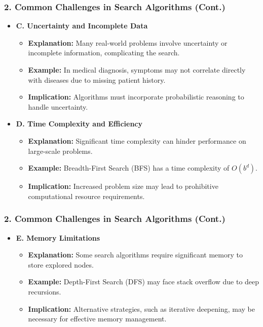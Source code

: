 \documentclass[aspectratio=169]{beamer}
\begin{document}
\begin{frame}[fragile]
    \frametitle{2. Common Challenges in Search Algorithms (Cont.)}
    \begin{itemize}
        \item \textbf{C. Uncertainty and Incomplete Data}
        \begin{itemize}
            \item \textbf{Explanation:} Many real-world problems involve uncertainty or incomplete information, complicating the search.
            \item \textbf{Example:} In medical diagnosis, symptoms may not correlate directly with diseases due to missing patient history.
            \item \textbf{Implication:} Algorithms must incorporate probabilistic reasoning to handle uncertainty.
        \end{itemize}
        
        \item \textbf{D. Time Complexity and Efficiency}
        \begin{itemize}
            \item \textbf{Explanation:} Significant time complexity can hinder performance on large-scale problems.
            \item \textbf{Example:} Breadth-First Search (BFS) has a time complexity of \(O(b^d)\).
            \item \textbf{Implication:} Increased problem size may lead to prohibitive computational resource requirements.
        \end{itemize}
    \end{itemize}
\end{frame}

\begin{frame}[fragile]
    \frametitle{2. Common Challenges in Search Algorithms (Cont.)}
    \begin{itemize}
        \item \textbf{E. Memory Limitations}
        \begin{itemize}
            \item \textbf{Explanation:} Some search algorithms require significant memory to store explored nodes.
            \item \textbf{Example:} Depth-First Search (DFS) may face stack overflow due to deep recursions.
            \item \textbf{Implication:} Alternative strategies, such as iterative deepening, may be necessary for effective memory management.
        \end{itemize}
    \end{itemize}
\end{frame}
\end{document}
